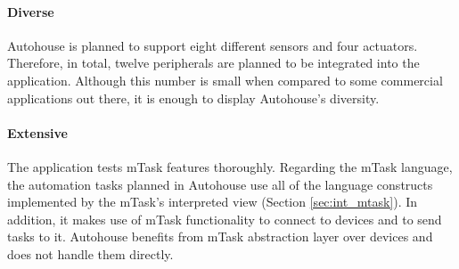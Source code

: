 \paragraph{Diverse} Autohouse is planned to support eight different sensors and four actuators. Therefore, in total, twelve peripherals are planned to be integrated into the application. Although this number is small when compared to some commercial applications out there, it is enough to display Autohouse's diversity.

\paragraph{Extensive} The application tests mTask features thoroughly. Regarding the mTask language, the automation tasks planned in Autohouse use all of the language constructs implemented by the mTask's interpreted view (Section \ref{sec:int_mtask}). In addition, it makes use of mTask functionality to connect to devices and to send tasks to it. Autohouse benefits from mTask abstraction layer over devices and does not handle them directly.


